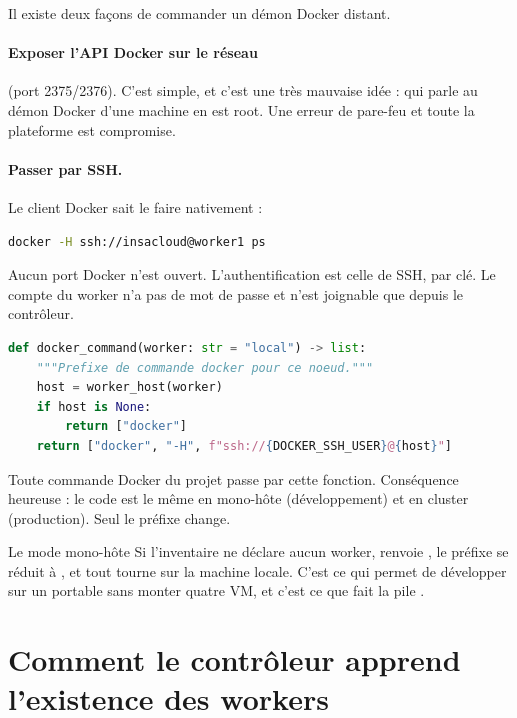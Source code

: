 Il existe deux façons de commander un démon Docker distant.

\paragraph{Exposer l'API Docker sur le réseau} (port 2375/2376). C'est simple,
et c'est une très mauvaise idée : qui parle au démon Docker d'une machine en
est root. Une erreur de pare-feu et toute la plateforme est compromise.

\paragraph{Passer par SSH.} Le client Docker sait le faire nativement :

\begin{lstlisting}[language=bash]
docker -H ssh://insacloud@worker1 ps
\end{lstlisting}

Aucun port Docker n'est ouvert. L'authentification est celle de SSH, par clé.
Le compte  du worker n'a pas de mot de passe et n'est
joignable que depuis le contrôleur.

\begin{lstlisting}[language=Python,caption={\fichier{2\_webapp/workers.py} --- le préfixe de commande}]
def docker_command(worker: str = "local") -> list:
    """Prefixe de commande docker pour ce noeud."""
    host = worker_host(worker)
    if host is None:
        return ["docker"]
    return ["docker", "-H", f"ssh://{DOCKER_SSH_USER}@{host}"]
\end{lstlisting}

Toute commande Docker du projet passe par cette fonction. Conséquence
heureuse : le code est le même en mono-hôte (développement) et en cluster
(production). Seul le préfixe change.

\begin{notion}{Le mode mono-hôte}
Si l'inventaire ne déclare aucun worker,  renvoie
, le préfixe se réduit à , et tout tourne sur la machine
locale. C'est ce qui permet de développer sur un portable sans monter quatre
VM, et c'est ce que fait la pile .
\end{notion}

\section{Comment le contrôleur apprend l'existence des workers}

